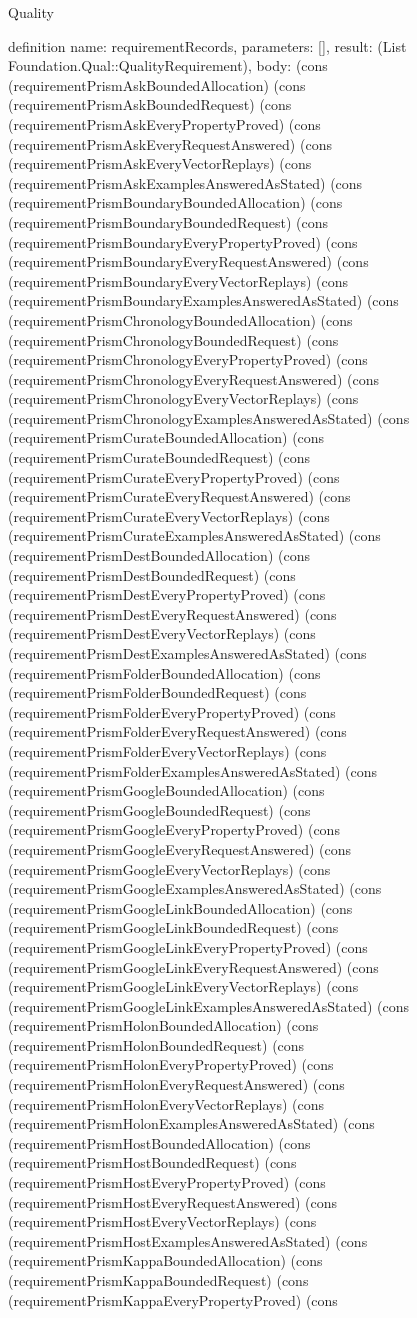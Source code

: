 \begin{lexlean}{Quality}
\begin{semanticmodule}
definition{
  name: requirementRecords,
  parameters: [],
  result: (List Foundation.Qual::QualityRequirement),
  body: (cons (requirementPrismAskBoundedAllocation) (cons (requirementPrismAskBoundedRequest) (cons (requirementPrismAskEveryPropertyProved) (cons (requirementPrismAskEveryRequestAnswered) (cons (requirementPrismAskEveryVectorReplays) (cons (requirementPrismAskExamplesAnsweredAsStated) (cons (requirementPrismBoundaryBoundedAllocation) (cons (requirementPrismBoundaryBoundedRequest) (cons (requirementPrismBoundaryEveryPropertyProved) (cons (requirementPrismBoundaryEveryRequestAnswered) (cons (requirementPrismBoundaryEveryVectorReplays) (cons (requirementPrismBoundaryExamplesAnsweredAsStated) (cons (requirementPrismChronologyBoundedAllocation) (cons (requirementPrismChronologyBoundedRequest) (cons (requirementPrismChronologyEveryPropertyProved) (cons (requirementPrismChronologyEveryRequestAnswered) (cons (requirementPrismChronologyEveryVectorReplays) (cons (requirementPrismChronologyExamplesAnsweredAsStated) (cons (requirementPrismCurateBoundedAllocation) (cons (requirementPrismCurateBoundedRequest) (cons (requirementPrismCurateEveryPropertyProved) (cons (requirementPrismCurateEveryRequestAnswered) (cons (requirementPrismCurateEveryVectorReplays) (cons (requirementPrismCurateExamplesAnsweredAsStated) (cons (requirementPrismDestBoundedAllocation) (cons (requirementPrismDestBoundedRequest) (cons (requirementPrismDestEveryPropertyProved) (cons (requirementPrismDestEveryRequestAnswered) (cons (requirementPrismDestEveryVectorReplays) (cons (requirementPrismDestExamplesAnsweredAsStated) (cons (requirementPrismFolderBoundedAllocation) (cons (requirementPrismFolderBoundedRequest) (cons (requirementPrismFolderEveryPropertyProved) (cons (requirementPrismFolderEveryRequestAnswered) (cons (requirementPrismFolderEveryVectorReplays) (cons (requirementPrismFolderExamplesAnsweredAsStated) (cons (requirementPrismGoogleBoundedAllocation) (cons (requirementPrismGoogleBoundedRequest) (cons (requirementPrismGoogleEveryPropertyProved) (cons (requirementPrismGoogleEveryRequestAnswered) (cons (requirementPrismGoogleEveryVectorReplays) (cons (requirementPrismGoogleExamplesAnsweredAsStated) (cons (requirementPrismGoogleLinkBoundedAllocation) (cons (requirementPrismGoogleLinkBoundedRequest) (cons (requirementPrismGoogleLinkEveryPropertyProved) (cons (requirementPrismGoogleLinkEveryRequestAnswered) (cons (requirementPrismGoogleLinkEveryVectorReplays) (cons (requirementPrismGoogleLinkExamplesAnsweredAsStated) (cons (requirementPrismHolonBoundedAllocation) (cons (requirementPrismHolonBoundedRequest) (cons (requirementPrismHolonEveryPropertyProved) (cons (requirementPrismHolonEveryRequestAnswered) (cons (requirementPrismHolonEveryVectorReplays) (cons (requirementPrismHolonExamplesAnsweredAsStated) (cons (requirementPrismHostBoundedAllocation) (cons (requirementPrismHostBoundedRequest) (cons (requirementPrismHostEveryPropertyProved) (cons (requirementPrismHostEveryRequestAnswered) (cons (requirementPrismHostEveryVectorReplays) (cons (requirementPrismHostExamplesAnsweredAsStated) (cons (requirementPrismKappaBoundedAllocation) (cons (requirementPrismKappaBoundedRequest) (cons (requirementPrismKappaEveryPropertyProved) (cons }
\end{semanticmodule}
\end{lexlean}
